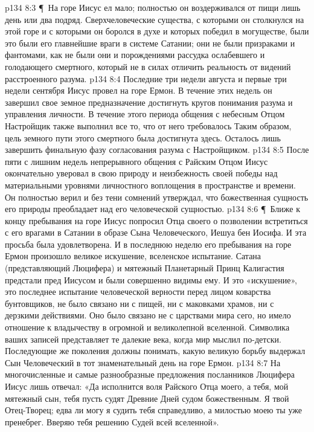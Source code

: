 \vs p134 8:3 \P\ На горе Иисус ел мало; полностью он воздерживался от пищи лишь день или два подряд. Сверхчеловеческие существа, с которыми он столкнулся на этой горе и с которыми он боролся в духе и которых победил в могуществе, были  это были его главнейшие враги в системе Сатании; они не были призраками и фантомами, как не были они и порождениями рассудка ослабевшего и голодающего смертного, который не в силах отличить реальность от видений расстроенного разума.
\vs p134 8:4 Последние три недели августа и первые три недели сентября Иисус провел на горе Ермон. В течение этих недель он завершил свое земное предназначение достигнуть кругов понимания разума и управления личности. В течение этого периода общения с небесным Отцом Настройщик также выполнил все то, что от него требовалось Таким образом, цель земного пути этого смертного была достигнута здесь. Осталось лишь завершить финальную фазу согласования разума с Настройщиком.
\vs p134 8:5 После пяти с лишним недель непрерывного общения с Райским Отцом Иисус окончательно уверовал в свою природу и неизбежность своей победы над материальными уровнями личностного воплощения в пространстве и времени. Он полностью верил и без тени сомнений утверждал, что божественная сущность его природы преобладает над его человеческой сущностью.
\vs p134 8:6 \P\ Ближе к концу пребывания на горе Иисус попросил Отца своего о позволении встретиться с его врагами в Сатании в образе Сына Человеческого, Иешуа бен Иосифа. И эта просьба была удовлетворена. И в последнюю неделю его пребывания на горе Ермон произошло великое искушение, вселенское испытание. Сатана (представляющий Люцифера) и мятежный Планетарный Принц Калигастия предстали пред Иисусом и были совершенно видимы ему. И это «искушение», это последнее испытание человеческой верности перед лицом коварства бунтовщиков, не было связано ни с пищей, ни с маковками храмов, ни с дерзкими действиями. Оно было связано не с царствами мира сего, но имело отношение к владычеству в огромной и великолепной вселенной. Символика ваших записей представляет те далекие века, когда мир мыслил по\hyp{}детски. Последующие же поколения должны понимать, какую великую борьбу выдержал Сын Человеческий в тот знаменательный день на горе Ермон.
\vs p134 8:7 На многочисленные и самые разнообразные предложения посланников Люцифера Иисус лишь отвечал: «Да исполнится воля Райского Отца моего, а тебя, мой мятежный сын, тебя пусть судят Древние Дней судом божественным. Я твой Отец\hyp{}Творец; едва ли могу я судить тебя справедливо, а милостью моею ты уже пренебрег. Вверяю тебя решению Судей всей вселенной».
